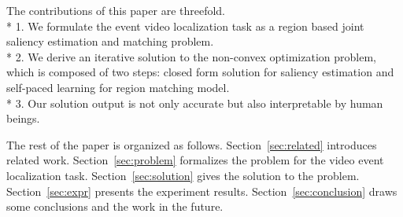 The contributions of this paper are threefold. \\* 
1. We formulate the event video localization task as a region based joint saliency estimation and matching problem. \\*
2. We derive an iterative solution to the non-convex optimization problem, which is composed of two steps: closed form solution for saliency estimation and self-paced learning for region matching model. \\*
3. Our solution output is not only accurate but also interpretable by human beings. 

The rest of the paper is organized as follows. 
Section~\ref{sec:related} introduces related work. 
Section~\ref{sec:problem} formalizes the problem for the video event localization task. 
Section~\ref{sec:solution} gives the solution to the problem. 
Section~\ref{sec:expr} presents the experiment results. 
Section~\ref{sec:conclusion} draws some conclusions and the work in the future.
